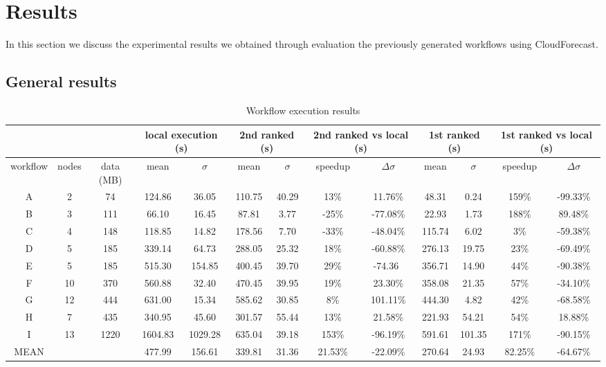 \documentclass[10pt, conference, compsocconf]{IEEEtran}
\newcommand{\sysname}{CloudForecast\xspace}
\begin{document}
\section{Results}
\label{sec:results}
In this section we discuss the experimental results we obtained through evaluation the previously generated workflows using \sysname.

\subsection{General results}






\begin{table*}[!t]
\renewcommand{\arraystretch}{1.2}
\caption{Workflow execution results}
\label{tab:wf_execution}
\centering
\begin{tabular}{|ccc|||cc||cc|cc||cc|cc|}
\multicolumn{3}{c}{}& \multicolumn{2}{c}{local execution (s)} & \multicolumn{2}{c}{2nd ranked (s)} & \multicolumn{2}{c}{2nd ranked vs local (s)} & \multicolumn{2}{c}{1st ranked (s)} & \multicolumn{2}{c}{1st ranked vs local (s)} \\
\hline
workflow & nodes & data (MB) & mean & $\sigma$ & mean & $\sigma$ & speedup &  $\Delta\sigma$ & mean &  $\sigma$ & speedup & $\Delta\sigma$\\
\hline
A  & 2 &   74   &124.86 & 36.05 & 110.75 &   40.29 &  13\%  &  11.76\%  & 48.31    & 0.24   &   159\% & -99.33\%     \\
B  & 3 &   111   &66.10 & 16.45 & 87.81 &      3.77 &  -25\%  & -77.08\%  & 22.93    & 1.73   &  188\% &  89.48\%     \\
C  & 4 &   148   &118.85 & 14.82 & 178.56 &    7.70 &  -33\%  &  -48.04\% & 115.74  & 6.02   &   3\%   &  -59.38\%    \\
D  & 5 &   185   &339.14 & 64.73 & 288.05 &   25.32 &  18\%  &   -60.88\% & 276.13    & 19.75   &23\%  &   -69.49\%      \\
E  & 5 &   185   &515.30 & 154.85 & 400.45 &   39.70 &  29\%  &   -74.36\ & 356.71    & 14.90   &44\%  &  -90.38\%       \\
F  & 10 &  370   & 560.88 & 32.40 & 470.45 &   39.95 & 19\%   &  23.30\%  & 358.08    & 21.35   &57\%  &   -34.10\%     \\
G  & 12 &  444   & 631.00 & 15.34 & 585.62 &  30.85 &   8\%  &   101.11\% & 444.30   & 4.82   &  42\%  &  -68.58\%     \\
H & 7 & 435 & 340.95 & 45.60 &  301.57 & 55.44 & 13\% & 21.58\%       & 221.93 & 54.21 & 54\% & 18.88\% \\
I & 13 & 1220 & 1604.83 & 1029.28       &  635.04 & 39.18 & 153\% & -96.19\%     & 591.61 & 101.35 & 171\% & -90.15\%\\
\hline
MEAN & && 477.99 & 156.61 &        339.81 &  31.36 & 21.53\% & -22.09\%      &270.64 &  24.93 & 82.25\% & -64.67\%\\
\hline
\end{tabular}
\end{table*}
\end{document}
